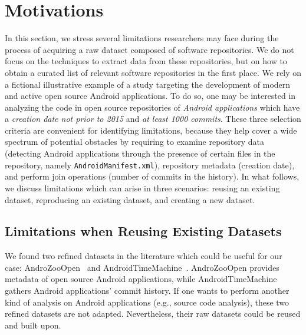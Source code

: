 \section{Motivations}
\label{sec:motivations}

In this section, we stress several limitations researchers may face during the process of acquiring a raw dataset composed of software repositories. 
We do not focus on the techniques to extract data from these repositories, but on how to obtain a curated list of relevant software repositories in the first place. 
We rely on a fictional illustrative example of a study targeting the development of modern and active open source Android applications.
To do so, one may be interested in analyzing the code in open source repositories of \emph{Android applications} which have a \emph{creation date not prior to 2015} and \emph{at least 1000 commits}.
These three selection criteria are convenient for identifying limitations, because they help cover a wide spectrum of potential obstacles by requiring to examine repository data (detecting Android applications through the presence of certain files in the repository, namely \texttt{AndroidManifest.xml}), repository metadata (creation date), and perform join operations (number of commits in the history).
In what follows, we discuss limitations which can arise in three scenarios: reusing an existing dataset, reproducing an existing dataset, and creating a new dataset.

\subsection{Limitations when Reusing Existing Datasets}

We found two refined datasets in the literature which could be useful for our case: AndroZooOpen~\cite{liu2020androzooopen} and AndroidTimeMachine~\cite{geiger2018graph}. 
AndroZooOpen provides metadata of open source Android applications, while AndroidTimeMachine gathers Android applications' commit history. 
If one wants to perform another kind of analysis on Android applications (e.g., source code analysis), these two refined datasets are not adapted. Nevertheless, their raw datasets could be reused and built upon.

